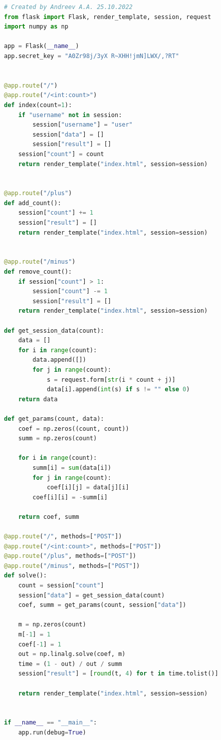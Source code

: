 \documentclass[a4paper, 12pt]{article}
\begin{document}

\lstset{style=mystyle}

\begin{lstlisting}[language=Python, caption = Программная реализация определения времени пребывания сложной системы в каждом из состояний]
# Created by Andreev A.A. 25.10.2022
from flask import Flask, render_template, session, request
import numpy as np

app = Flask(__name__)
app.secret_key = "A0Zr98j/3yX R~XHH!jmN]LWX/,?RT"


@app.route("/")
@app.route("/<int:count>")
def index(count=1):
    if "username" not in session:
        session["username"] = "user"
        session["data"] = []
        session["result"] = []
    session["count"] = count
    return render_template("index.html", session=session)


@app.route("/plus")
def add_count():
    session["count"] += 1
    session["result"] = []
    return render_template("index.html", session=session)


@app.route("/minus")
def remove_count():
    if session["count"] > 1:
        session["count"] -= 1
        session["result"] = []
    return render_template("index.html", session=session)

def get_session_data(count):
    data = []
    for i in range(count):
        data.append([])
        for j in range(count):
            s = request.form[str(i * count + j)]
            data[i].append(int(s) if s != "" else 0)
    return data

def get_params(count, data):
    coef = np.zeros((count, count))
    summ = np.zeros(count)

    for i in range(count):
        summ[i] = sum(data[i])
        for j in range(count):
            coef[i][j] = data[j][i]
        coef[i][i] = -summ[i]

    return coef, summ

@app.route("/", methods=["POST"])
@app.route("/<int:count>", methods=["POST"])
@app.route("/plus", methods=["POST"])
@app.route("/minus", methods=["POST"])
def solve():
    count = session["count"]
    session["data"] = get_session_data(count)
    coef, summ = get_params(count, session["data"])

    m = np.zeros(count)
    m[-1] = 1
    coef[-1] = 1
    out = np.linalg.solve(coef, m)
    time = (1 - out) / out / summ
    session["result"] = [round(t, 4) for t in time.tolist()]

    return render_template("index.html", session=session)


if __name__ == "__main__":
    app.run(debug=True)
\end{lstlisting}
\end{document}

